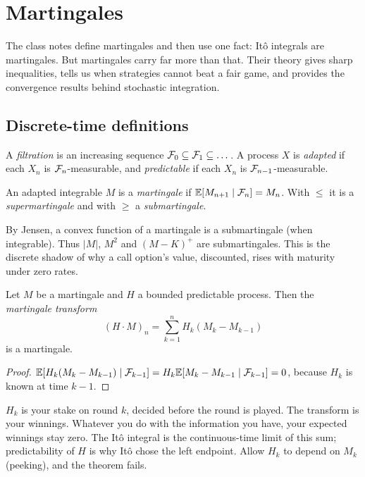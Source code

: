 \chapter{Martingales}\label{ch:mart}

The class notes define martingales and then use one fact: Itô integrals are martingales. But martingales carry far more than that. Their theory gives sharp inequalities, tells us when strategies cannot beat a fair game, and provides the convergence results behind stochastic integration.

\section{Discrete-time definitions}

A \emph{filtration} is an increasing sequence $\mathcal{F}_0\subseteq\mathcal{F}_1\subseteq\dots$. A process $X$ is \emph{adapted} if each $X_n$ is $\mathcal{F}_n$-measurable, and \emph{predictable} if each $X_n$ is $\mathcal{F}_{n-1}$-measurable.

\begin{definition}
An adapted integrable $M$ is a \emph{martingale} if $\mathbb{E}[M_{n+1}\mid\mathcal{F}_n]=M_n$. With $\le$ it is a \emph{supermartingale} and with $\ge$ a \emph{submartingale}.
\end{definition}

By Jensen, a convex function of a martingale is a submartingale (when integrable). Thus $|M|$, $M^2$ and $(M-K)^+$ are submartingales. This is the discrete shadow of why a call option's value, discounted, rises with maturity under zero rates.

\begin{theorem}\label{thm:transform}
Let $M$ be a martingale and $H$ a bounded predictable process. Then the \emph{martingale transform}
\[
(H\cdot M)_n=\sum_{k=1}^n H_k(M_k-M_{k-1})
\]
is a martingale.
\end{theorem}
\begin{proof}
$\mathbb{E}[H_k(M_k-M_{k-1})\mid\mathcal{F}_{k-1}]=H_k\mathbb{E}[M_k-M_{k-1}\mid\mathcal{F}_{k-1}]=0$, because $H_k$ is known at time $k-1$.
\end{proof}

\begin{intuition}
$H_k$ is your stake on round $k$, decided before the round is played. The transform is your winnings. Whatever you do with the information you have, your expected winnings stay zero. The It\^o integral is the continuous-time limit of this sum; predictability of $H$ is why Itô chose the left endpoint. Allow $H_k$ to depend on $M_k$ (peeking), and the theorem fails.
\end{intuition}

